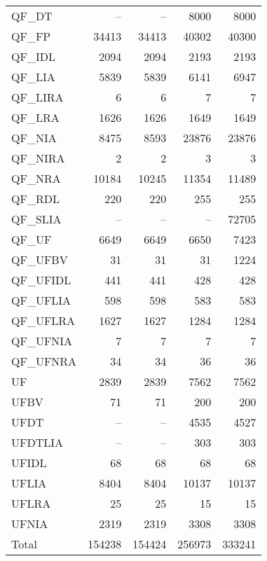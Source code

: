 \documentclass[twoside,11pt]{article}
\begin{document}
\begin{table}
{\begin{tabular}{|l|r|r|r|r|}
    QF\_DT     &     -- &     -- &   8000 &  8000 \\
    QF\_FP     &  34413 &  34413 &  40302 & 40300 \\
    QF\_IDL    &   2094 &   2094 &   2193 &  2193 \\
    QF\_LIA    &   5839 &   5839 &   6141 &  6947 \\
    QF\_LIRA   &      6 &      6 &      7 &     7 \\
    QF\_LRA    &   1626 &   1626 &   1649 &  1649 \\
    QF\_NIA    &   8475 &   8593 &  23876 & 23876 \\
    QF\_NIRA   &      2 &      2 &      3 &     3 \\
    QF\_NRA    &  10184 &  10245 &  11354 & 11489 \\
    QF\_RDL    &    220 &    220 &    255 &   255 \\
    QF\_SLIA   &     -- &     -- &     -- & 72705 \\
    QF\_UF     &   6649 &   6649 &   6650 &  7423 \\
    QF\_UFBV   &     31 &     31 &     31 &  1224 \\
    QF\_UFIDL  &    441 &    441 &    428 &   428 \\
    QF\_UFLIA  &    598 &    598 &    583 &   583 \\
    QF\_UFLRA  &   1627 &   1627 &   1284 &  1284 \\
    QF\_UFNIA  &      7 &      7 &      7 &     7 \\
    QF\_UFNRA  &     34 &     34 &     36 &    36 \\
    UF         &   2839 &   2839 &   7562 &  7562 \\
    UFBV       &     71 &     71 &    200 &   200 \\
    UFDT       &     -- &     -- &   4535 &  4527 \\
    UFDTLIA    &     -- &     -- &    303 &   303 \\
    UFIDL      &     68 &     68 &     68 &    68 \\
    UFLIA      &   8404 &   8404 &  10137 & 10137 \\
    UFLRA      &     25 &     25 &     15 &    15 \\
    UFNIA      &   2319 &   2319 &   3308 &  3308 \\
    \hline
    Total      & 154238 & 154424 & 256973 & 333241 \\
    \hline
  \end{tabular}}
\end{table}
\end{document}
